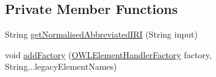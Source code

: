 \subsection*{Private Member Functions}
\begin{DoxyCompactItemize}
\item 
String \hyperlink{classorg_1_1coode_1_1owlapi_1_1owlxmlparser_1_1_o_w_l_x_m_l_parser_handler_a2dc5c25360cad2123cde7fe5b71fe03c}{get\-Normalised\-Abbreviated\-I\-R\-I} (String input)
\item 
void \hyperlink{classorg_1_1coode_1_1owlapi_1_1owlxmlparser_1_1_o_w_l_x_m_l_parser_handler_a6a54150fd97d27d5eb71c88ea2db1f33}{add\-Factory} (\hyperlink{interfaceorg_1_1coode_1_1owlapi_1_1owlxmlparser_1_1_o_w_l_element_handler_factory}{O\-W\-L\-Element\-Handler\-Factory} factory, String...\-legacy\-Element\-Names)
\end{DoxyCompactItemize}
